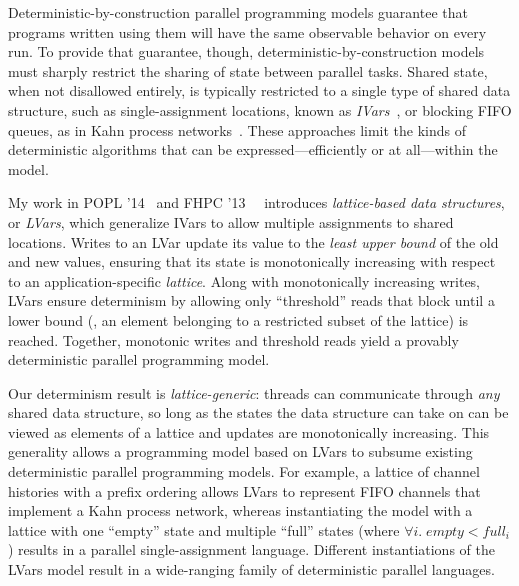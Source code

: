 \documentclass{article}
\begin{document}
Deterministic-by-construction parallel programming models guarantee
that programs written using them will have the same observable
behavior on every run.  To provide that guarantee, though,
deterministic-by-construction models must sharply restrict the sharing
of state between parallel tasks.  Shared state, when not disallowed
entirely, is typically restricted to a single type of shared data
structure, such as single-assignment locations, known as
\emph{IVars}~\cite{IStructures, CnC}, or blocking FIFO queues, as in
Kahn process networks~\cite{Kahn-1974}.  These approaches limit the
kinds of deterministic algorithms that can be expressed---efficiently
or at all---within the model.

My work in POPL '14~\cite{Freeze-paper}\nocite{Freeze-TR} and FHPC
'13~~\cite{LVars-paper}\nocite{LVars-TR} introduces \emph{lattice-based data
  structures}, or \emph{LVars}, which generalize IVars
to allow multiple assignments to shared locations.  Writes to an LVar
update its value to the \emph{least upper bound} of the old and new
values, ensuring that its state is monotonically increasing with
respect to an application-specific \emph{lattice}.  Along with
monotonically increasing writes, LVars ensure determinism by allowing
only ``threshold'' reads that block until a lower bound (\ie, an
element belonging to a restricted subset of the lattice) is reached.
Together, monotonic writes and threshold reads yield a provably
deterministic parallel programming model.

Our determinism result is \emph{lattice-generic}: threads can
communicate through \emph{any} shared data structure, so long as the
states the data structure can take on can be viewed as elements of a
lattice and updates are monotonically increasing.  This generality
allows a programming model based on LVars to subsume existing
deterministic parallel programming models.  For example, a lattice of
channel histories with a prefix ordering allows LVars to represent
FIFO channels that implement a Kahn process network, whereas
instantiating the model with a lattice with one ``empty'' state and
multiple ``full'' states (where $\forall{i}.\; \mathit{empty} <
\mathit{full_i}$) results in a parallel single-assignment language.
Different instantiations of the LVars model result in a wide-ranging
family of deterministic parallel languages.
\end{document}
